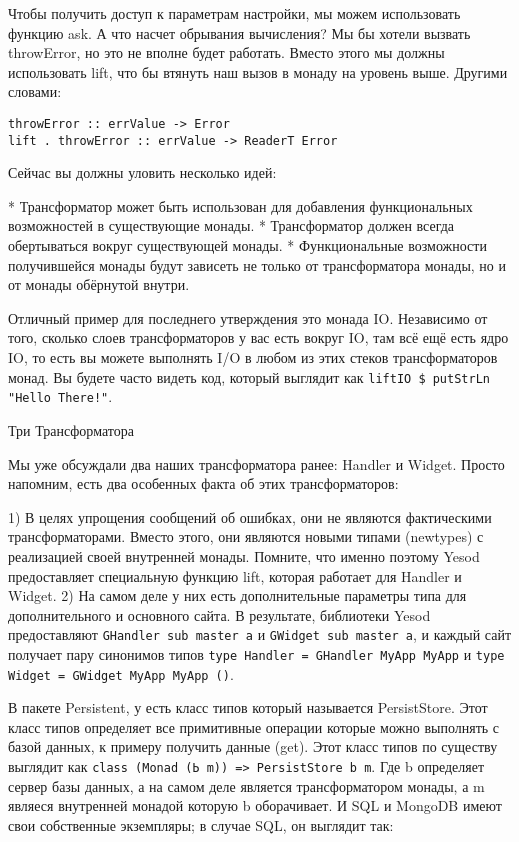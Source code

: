 Чтобы получить доступ к параметрам настройки, мы можем использовать функцию ask. А что насчет обрывания вычисления? Мы бы хотели вызвать throwError, но это не вполне будет работать. Вместо этого мы должны использовать lift, что бы втянуть наш вызов в монаду на уровень выше. Другими словами:

\begin{lstlisting}
throwError :: errValue -> Error
lift . throwError :: errValue -> ReaderT Error
\end{lstlisting}

Сейчас вы должны уловить несколько идей:

* Трансформатор может быть использован для добавления функциональных возможностей в существующие монады.
* Трансформатор должен всегда обертываться вокруг существующей монады.
* Функциональные возможности получившейся монады будут зависеть не только от трансформатора монады, но и от монады обёрнутой внутри.

Отличный пример для последнего утверждения это монада IO. Независимо от того, сколько слоев трансформаторов у вас есть вокруг IO, там всё ещё есть ядро IO, то есть вы можете выполнять I/O в любом из этих стеков трансформаторов монад. Вы будете часто видеть код, который выглядит как \lstinline'liftIO $ putStrLn "Hello There!"'.

Три Трансформатора

Мы уже обсуждали два наших трансформатора ранее: Handler и Widget. Просто напомним, есть два особенных факта об этих трансформаторов:

1) В целях упрощения сообщений об ошибках, они не являются фактическими трансформаторами. Вместо этого, они являются новыми типами (newtypes) с реализацией своей внутренней монады. Помните, что именно поэтому Yesod предоставляет специальную функцию lift, которая работает для Handler и Widget.
2) На самом деле у них есть дополнительные параметры типа для дополнительного и основного сайта. В результате, библиотеки Yesod предоставляют \lstinline'GHandler sub master a' и \lstinline'GWidget sub master a', и каждый сайт получает пару синонимов типов \lstinline'type Handler = GHandler MyApp MyApp' и \lstinline'type Widget = GWidget MyApp MyApp ()'.

В пакете Persistent, у есть класс типов который называется PersistStore. Этот класс типов определяет все примитивные операции которые можно выполнять с базой данных, к примеру получить данные (get). Этот класс типов по существу выглядит как \lstinline'class (Monad (Ь m)) => PersistStore b m'. Где b определяет сервер базы данных, а на самом деле является трансформатором монады, а m являеся внутренней монадой которую b оборачивает. И SQL и MongoDB имеют свои собственные экземпляры; в случае SQL, он выглядит так:

